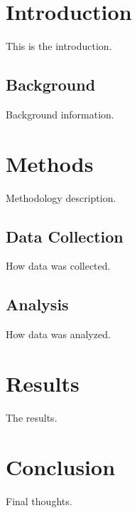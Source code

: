 \documentclass{article}
\begin{document}
\tableofcontents

\newpage

\section{Introduction}
\label{sec:intro}

This is the introduction.

\subsection{Background}

Background information.

\section{Methods}
\label{sec:methods}

Methodology description.

\subsection{Data Collection}

How data was collected.

\subsection{Analysis}

How data was analyzed.

\section{Results}

The results.

\section{Conclusion}

Final thoughts.
\end{document}
